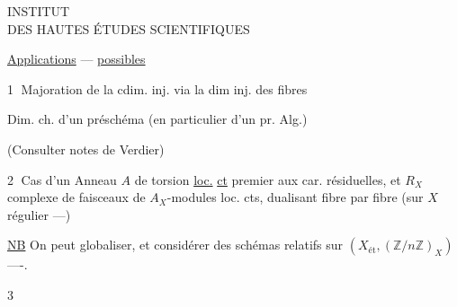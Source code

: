 \begin{center}
INSTITUT\\
DES HAUTES ÉTUDES SCIENTIFIQUES
\end{center}
\uline{Applications} --- \uline{possibles}

\textcircled{1} Majoration de la cdim. inj. via la dim inj. des fibres

Dim. ch.  d'un préschéma (en particulier d'un pr. Alg.)

(Consulter notes de Verdier)

\textcircled{2} Cas d'un Anneau $A$ de torsion \uline{loc.} \uline{ct} premier aux car. résiduelles, et $R_X$ complexe de faisceaux de $A_X$-modules \unsure{\{}loc. cts, dualisant fibre par fibre (sur $X$ régulier ---)

\uline{NB} On peut globaliser, et considérer des schémas relatifs sur $(X_{\text{ét}},(\mathbb{Z}/n\mathbb{Z})_X)$ ----.

\textcircled{3} 
